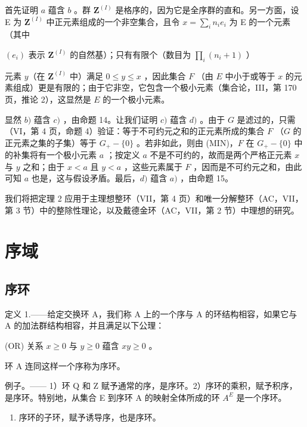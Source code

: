 首先证明 \(a\) 蕴含 \(b\) 。群 \(\mathbf{Z}^{(I)}\) 是格序的，因为它是全序群的直和。另一方面，设 E 为 \(\mathbf{Z}^{(I)}\) 中正元素组成的一个非空集合，且令 \(x = \sum_{i} n_i e_i\) 为 E 的一个元素（其中

\((e_{i})\) 表示 \(\mathbf{Z}^{(I)}\) 的自然基）；只有有限个（数目为 \(\prod_{i}(n_{i} + 1)\) ）

元素 \(y\)（在 \(\mathbf{Z}^{(I)}\) 中）满足 \(0 \leqslant y \leqslant x\) ，因此集合 \(F\) （由 \(E\) 中小于或等于 \(x\) 的元素组成）更是有限的；由于它非空，它包含一个极小元素（集合论，III，第 170 页，推论 2），这显然是 \(E\) 的一个极小元素。

显然 \(b)\) 蕴含 \(c)\) ，由命题 14。让我们证明 \(c)\) 蕴含 \(d)\) 。由于 \(G\) 是滤过的，只需（VI，第 4 页，命题 4）验证：等于不可约元之和的正元素所成的集合 \(F\) （\(G\) 的正元素之集的子集）等于 \(G_{+} - \{0\}\) 。若非如此，则由 (MIN)，\(F\) 在 \(G_{+} - \{0\}\) 中的补集将有一个极小元素 \(a\) ；按定义 \(a\) 不是不可约的，故而是两个严格正元素 \(x\) 与 \(y\) 之和；由于 \(x < a\) 且 \(y < a\) ，这些元素属于 \(F\) ，因而是不可约元之和，由此可知 \(a\) 也是，这与假设矛盾。最后，\(d)\) 蕴含 \(a)\) ，由命题 15。

我们将把定理 2 应用于主理想整环（VII，第 4 页）和唯一分解整环（AC，VII，第 3 节）中的整除性理论，以及戴德金环（AC，VII，第 2 节）中理想的研究。

\section{序域}

\subsection{序环}

定义 1.——给定交换环 A，我们称 A 上的一个序与 A 的环结构相容，如果它与 A 的加法群结构相容，并且满足以下公理：

(OR) 关系 \(x \geqslant 0\) 与 \(y \geqslant 0\) 蕴含 \(xy \geqslant 0\) 。

环 A 连同这样一个序称为序环。

例子。—— 1）环 Q 和 Z 赋予通常的序，是序环。2）序环的乘积，赋予积序，是序环。特别地，从集合 E 到序环 A 的映射全体所成的环 \(A^{E}\) 是一个序环。

\begin{enumerate}
\def\labelenumi{\arabic{enumi})}
\setcounter{enumi}{2}
\tightlist
\item
  序环的子环，赋予诱导序，也是序环。
\end{enumerate}

